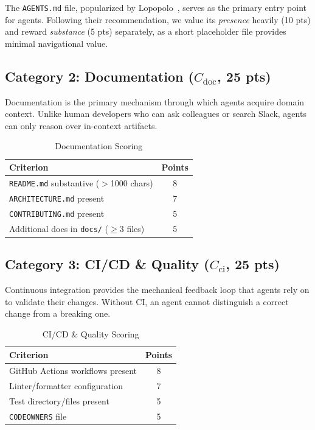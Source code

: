 \documentclass[11pt,twocolumn]{article}
\begin{document}
\noindent The \texttt{AGENTS.md} file, popularized by
Lopopolo~\citep{lopopolo2026harness}, serves as the primary entry
point for agents. Following their recommendation, we value its
\emph{presence} heavily (10 pts) and reward \emph{substance} (5 pts)
separately, as a short placeholder file provides minimal navigational
value.

\subsection{Category 2: Documentation ($C_{\text{doc}}$, 25 pts)}
\label{sec:cat2}

Documentation is the primary mechanism through which agents acquire
domain context. Unlike human developers who can ask colleagues or
search Slack, agents can only reason over in-context artifacts.

\begin{table}[H]
\centering
\caption{Documentation Scoring}
\label{tab:cat2}
\begin{tabular}{@{}lc@{}}
\toprule
\textbf{Criterion} & \textbf{Points} \\
\midrule
\texttt{README.md} substantive ($>$1000 chars) & 8 \\
\texttt{ARCHITECTURE.md} present & 7 \\
\texttt{CONTRIBUTING.md} present & 5 \\
Additional docs in \texttt{docs/} ($\geq$3 files) & 5 \\
\bottomrule
\end{tabular}
\end{table}

\subsection{Category 3: CI/CD \& Quality ($C_{\text{ci}}$, 25 pts)}
\label{sec:cat3}

Continuous integration provides the mechanical feedback loop that
agents rely on to validate their changes. Without CI, an agent
cannot distinguish a correct change from a breaking one.

\begin{table}[H]
\centering
\caption{CI/CD \& Quality Scoring}
\label{tab:cat3}
\begin{tabular}{@{}lc@{}}
\toprule
\textbf{Criterion} & \textbf{Points} \\
\midrule
GitHub Actions workflows present & 8 \\
Linter/formatter configuration & 7 \\
Test directory/files present & 5 \\
\texttt{CODEOWNERS} file & 5 \\
\bottomrule
\end{tabular}
\end{table}
\end{document}
